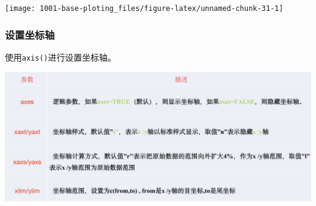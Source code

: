 \documentclass[
]{book}
\begin{document}
\begin{center}\texttt{[image: 1001-base-ploting\_files/figure-latex/unnamed-chunk-31-1]} \end{center}

\hypertarget{ux8bbeux7f6eux5750ux6807ux8f74}{%
\subsubsection{设置坐标轴}\label{ux8bbeux7f6eux5750ux6807ux8f74}}

使用\texttt{axis()}进行设置坐标轴。

\includegraphics{figure/7.jpg}
\end{document}
